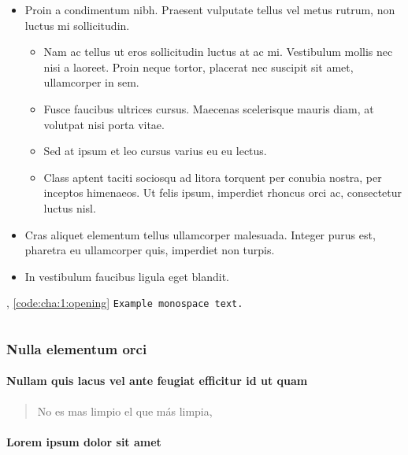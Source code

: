 \begin{itemize}
    \item Proin a condimentum nibh. Praesent vulputate tellus vel metus rutrum, non luctus mi sollicitudin. 
    \begin{itemize}
        \item Nam ac tellus ut eros sollicitudin luctus at ac mi. Vestibulum mollis nec nisi a laoreet. Proin neque tortor, placerat nec suscipit sit amet, ullamcorper in sem.
        \item Fusce faucibus ultrices cursus. Maecenas scelerisque mauris diam, at volutpat nisi porta vitae. 
        \item Sed at ipsum et leo cursus varius eu eu lectus. 
        \item Class aptent taciti sociosqu ad litora torquent per conubia nostra, per inceptos himenaeos. Ut felis ipsum, imperdiet rhoncus orci ac, consectetur luctus nisl. 
    \end{itemize}
    \item Cras aliquet elementum tellus ullamcorper malesuada. Integer purus est, pharetra eu ullamcorper quis, imperdiet non turpis.
    \item In vestibulum faucibus ligula eget blandit. 
\end{itemize}

\lipsum[22], \autoref{code:cha:1:opening} \lipsum[23]
\texttt{Example monospace text.}

\begin{code}
    \label{code:cha:1:opening}
    \inputminted[]{tex}{main.tex}
\end{code}

\subsubsection{Nulla elementum orci}

\paragraph{Nullam quis lacus vel ante feugiat efficitur id ut quam}

\lipsum[23]

\begin{quotation}
    No es mas limpio el que más limpia,
\end{quotation}

\paragraph{Lorem ipsum dolor sit amet}

